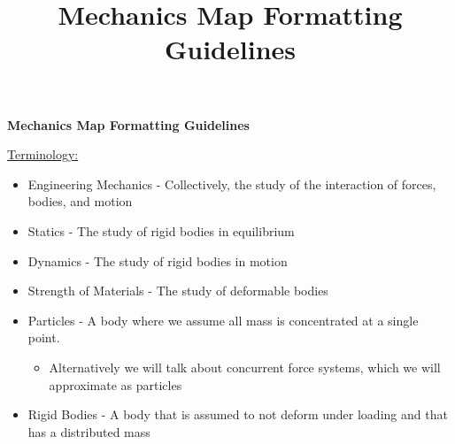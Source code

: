 \documentclass[a4paper]{article}
\begin{document}
\title{Mechanics Map Formatting Guidelines}

\begin{center} \textbf{Mechanics Map Formatting Guidelines}
\end{center}

\underline{Terminology:}
\begin{itemize}
	\item Engineering Mechanics - Collectively, the study of the interaction of forces, bodies, and motion
	\item Statics - The study of rigid bodies in equilibrium
	\item Dynamics - The study of rigid bodies in motion
	\item Strength of Materials - The study of deformable bodies
	\item Particles - A body where we assume all mass is concentrated at a single point.
	\begin{itemize}
				\item Alternatively we will talk about concurrent force systems, which we will approximate as particles
	\end{itemize}
	\item Rigid Bodies - A body that is assumed to not deform under loading and that has a distributed mass
\end{itemize}
\end{document}
